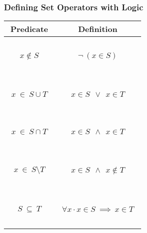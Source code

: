 \documentclass{beamer}
\begin{document}
\begin{frame}

\frametitle{Defining Set Operators with Logic}

\begin{center}
\begin{tabular}{|c|c|}
\hline
Predicate & Definition \\[2pt] \hline
~&\\
$x\not\in S$  &  $\lnot~(x\in S) $ \\
~&\\ \hline
~&\\
$~~x~\in~ S\cup T~~$  &  $~~x\in S  ~~\lor~~ x\in T~~$ \\
~&\\ \hline
~&\\
$x~\in~ S\cap T$  &  $x\in S  ~~\land~~ x\in T$ \\
~&\\ \hline
~&\\
$x~\in~ S\setminus T$  &  $x\in S  ~~\land~~ x\not\in T$ \\
~&\\ \hline
~&\\
$S~\subseteq~ T $  &  $~~\forall x \cdot x\in S  ~\implies~ x\in T~~$ \\
~&\\ \hline
\end{tabular}
\end{center}

\end{frame}
\end{document}
